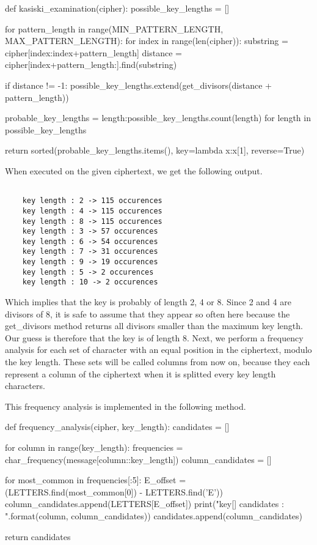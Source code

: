 \documentclass{article}
\begin{document}
\begin{python}

def kasiski_examination(cipher):
    possible_key_lengths = []

    for pattern_length in range(MIN_PATTERN_LENGTH, MAX_PATTERN_LENGTH):
        for index in range(len(cipher)):
            substring = cipher[index:index+pattern_length]
            distance = cipher[index+pattern_length:].find(substring)

            if distance != -1:
                possible_key_lengths.extend(get_divisors(distance + pattern_length))

    probable_key_lengths = {length:possible_key_lengths.count(length) for length in possible_key_lengths}

    return sorted(probable_key_lengths.items(), key=lambda x:x[1], reverse=True)

\end{python}

When executed on the given ciphertext, we get the following output.

\begin{verbatim}

    key length : 2 -> 115 occurences
    key length : 4 -> 115 occurences
    key length : 8 -> 115 occurences
    key length : 3 -> 57 occurences
    key length : 6 -> 54 occurences
    key length : 7 -> 31 occurences
    key length : 9 -> 19 occurences
    key length : 5 -> 2 occurences
    key length : 10 -> 2 occurences

\end{verbatim}

Which implies that the key is probably of length 2, 4 or 8. Since 2 and 4 are divisors of 8, it is safe to assume that they appear so often here because the get\_divisors method returns all divisors smaller than the maximum key length. Our guess is therefore that the key is of length 8.
Next, we perform a frequency analysis for each set of character with an equal position in the ciphertext, modulo the key length. These sets will be called columns from now on, because they each represent a column of the ciphertext when it is splitted every key length characters.

This frequency analysis is implemented in the following method. 

\begin{python}

def frequency_analysis(cipher, key_length):
    candidates = []

    for column in range(key_length):
        frequencies = char_frequency(message[column::key_length])
        column_candidates = []

        for most_common in frequencies[:5]:
            E_offset = (LETTERS.find(most_common[0]) - LETTERS.find('E')) %
            column_candidates.append(LETTERS[E_offset])
        print("key[{}] candidates : {}".format(column, column_candidates))
        candidates.append(column_candidates)

    return candidates
    
\end{python}
\end{document}
